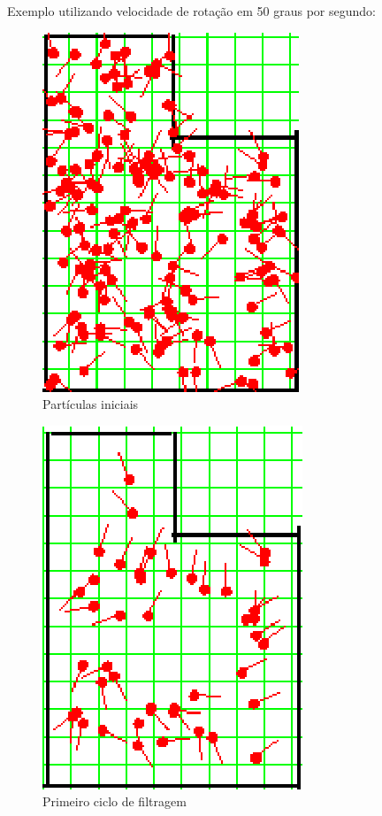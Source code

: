 Exemplo utilizando velocidade de rotação em 50 graus por segundo:

\begin{figure}[H]
  \centering
  \includegraphics[scale=1]{figuras/cen2_ex3/1.eps}
  \caption[Partículas Iniciais]{Partículas iniciais}
  \label{img:cen2_ex3_1}
\end{figure}

\begin{figure}[H]
  \centering
  \includegraphics[scale=1]{figuras/cen2_ex3/2.eps}
  \caption[Primeiro Ciclo de Filtragem]{Primeiro ciclo de filtragem}
  \label{img:cen2_ex3_2}
\end{figure}

